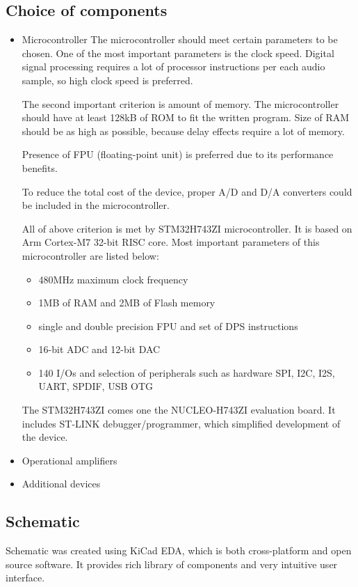 \documentclass{article}
\begin{document}
\subsection{Choice of components}
\begin{itemize}
    \item Microcontroller
    The microcontroller should meet certain parameters to be chosen.
    One of the most important parameters is the clock speed.
    Digital signal processing requires a lot of processor instructions per each audio sample,
    so high clock speed is preferred.

    The second important criterion is amount of memory.
    The microcontroller should have at least 128kB of ROM to fit the written program.
    Size of RAM should be as high as possible, because delay effects require a lot of memory.

    Presence of FPU (floating-point unit) is preferred due to its performance benefits.

    To reduce the total cost of the device, proper A/D and D/A converters could be included in the microcontroller.

    All of above criterion is met by STM32H743ZI microcontroller.
    It is based on Arm Cortex-M7 32-bit RISC core.
    Most important parameters of this microcontroller are listed below:
    \begin{itemize}
        \item 480MHz maximum clock frequency
        \item 1MB of RAM and 2MB of Flash memory
        \item single and double precision FPU and set of DPS instructions
        \item 16-bit ADC and 12-bit DAC
        \item 140 I/Os and selection of peripherals such as hardware SPI, I2C, I2S, UART, SPDIF, USB OTG
    \end{itemize}

    The STM32H743ZI comes one the NUCLEO-H743ZI evaluation board. It includes ST-LINK debugger/programmer, which simplified development of the device. 
    \item Operational amplifiers
    \item Additional devices
\end{itemize}

\subsection{Schematic}
Schematic was created using KiCad EDA, which is both cross-platform and open source software.
It provides rich library of components and very intuitive user interface.
\end{document}
